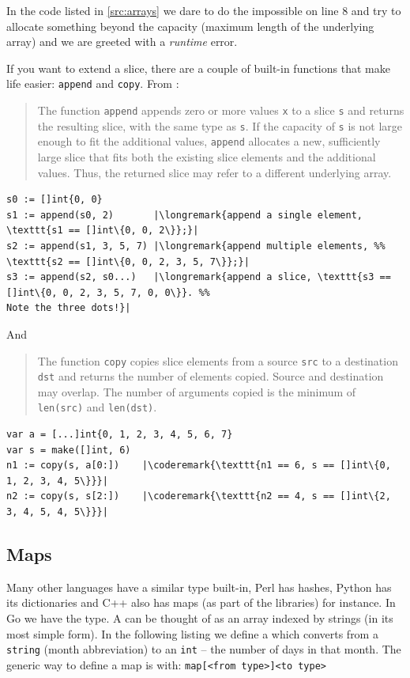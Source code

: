 In the code listed in \ref{src:arrays} we dare to do the impossible on
line 8 and try to allocate something
beyond the capacity (maximum length of the underlying array) and
we are greeted with a \emph{runtime} error.

If you want to extend a slice, there are a couple of built-in functions
that make life easier:
\lstinline{append} and \lstinline{copy}. From \cite{go_spec}:
\begin{quote}
The function \lstinline{append} appends zero or more values \lstinline{x} to a
slice \lstinline{s} and returns the resulting slice, with the same type as
\lstinline{s}.
If the capacity of \lstinline{s} is not large enough to fit the additional values,
\lstinline{append} allocates a new, sufficiently large slice that fits both the
existing slice elements and the additional values. Thus, the returned
slice may refer to a different underlying array.
\end{quote}
\begin{lstlisting}
s0 := []int{0, 0}
s1 := append(s0, 2)       |\longremark{append a single element, \texttt{s1 == []int\{0, 0, 2\}};}|
s2 := append(s1, 3, 5, 7) |\longremark{append multiple elements, %% 
\texttt{s2 == []int\{0, 0, 2, 3, 5, 7\}};}|
s3 := append(s2, s0...)   |\longremark{append a slice, \texttt{s3 == []int\{0, 0, 2, 3, 5, 7, 0, 0\}}. %%
Note the three dots!}|
\end{lstlisting}
\showremarks
And
\begin{quote}
The function \lstinline{copy} copies slice elements from a source
\lstinline{src} to a
destination \lstinline{dst} and returns the number of elements copied. Source and
destination may overlap. The number of arguments
copied is the minimum of \lstinline{len(src)} and
\mbox{\lstinline{len(dst)}}.
\end{quote}
\begin{lstlisting}
var a = [...]int{0, 1, 2, 3, 4, 5, 6, 7}
var s = make([]int, 6)
n1 := copy(s, a[0:])    |\coderemark{\texttt{n1 == 6, s == []int\{0, 1, 2, 3, 4, 5\}}}|
n2 := copy(s, s[2:])    |\coderemark{\texttt{n2 == 4, s == []int\{2, 3, 4, 5, 4, 5\}}}|
\end{lstlisting}

\subsection{Maps}
\label{sec:maps}
Many other languages have a similar type built-in, Perl has hashes,
Python has its dictionaries and C++ also has maps (as part of the libraries) for instance. 
In Go we have the
 type. A  can be thought of as an array indexed by
strings (in its most simple form).
In the following listing we define a  which converts from a
\lstinline{string} (month abbreviation) to an \lstinline{int} -- the number of days in that month. 
The generic way to define a map is with: \verb|map[<from type>]<to type>|

